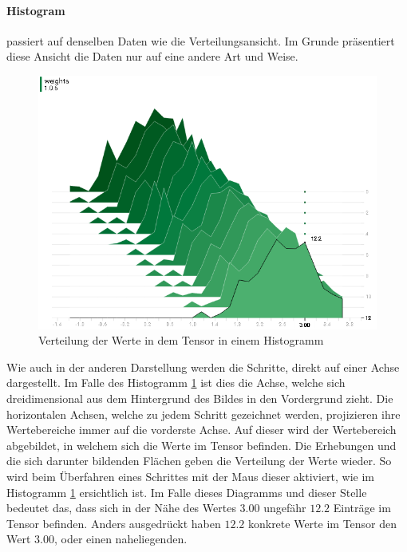 

\paragraph{Histogram} passiert auf denselben Daten wie die Verteilungsansicht. 
Im Grunde präsentiert diese Ansicht die Daten nur auf eine andere Art und Weise. 
\begin{figure}
	\centering
	\includegraphics[scale=0.7]{images/histogram-value.png}
	\caption{Verteilung der Werte in dem Tensor in einem Histogramm}
	\label{fig:Histogram}
\end{figure}
Wie auch in der anderen Darstellung werden die Schritte, direkt auf einer Achse dargestellt. 
Im Falle des Histogramm \ref{fig:Histogram} ist dies die Achse, welche sich dreidimensional aus dem Hintergrund des Bildes in den Vordergrund zieht. 
Die horizontalen Achsen, welche zu jedem Schritt gezeichnet werden, projizieren ihre Wertebereiche immer auf die vorderste Achse. 
Auf dieser wird der Wertebereich abgebildet, in welchem sich die Werte im Tensor befinden. 
Die Erhebungen und die sich darunter bildenden Flächen geben die Verteilung der Werte wieder. 
So wird beim Überfahren eines Schrittes mit der Maus dieser aktiviert, wie im Histogramm \ref{fig:Histogram} ersichtlich ist. 
Im Falle dieses Diagramms und dieser Stelle bedeutet das, dass sich in der Nähe des Wertes $3.00$ ungefähr $12.2$ Einträge im Tensor befinden. 
Anders ausgedrückt haben $12.2$ konkrete Werte im Tensor den Wert $3.00$, oder einen naheliegenden. 
